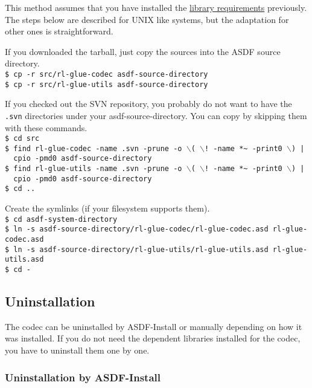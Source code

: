 \documentclass[11pt,a4paper,dvipdfm]{article}
\newcommand{\prompttext}[1]{\texttt{#1}}
\newcommand{\shprompt}[1]{\prompttext{\$ #1}}
\begin{document}
This method assumes that you have installed the
\hyperlink{softreqs}{library requirements} previously. The steps below are
described for UNIX like systems, but the adaptation for other ones is
straightforward.

If you downloaded the tarball, just copy the sources into the ASDF source
directory. \\
\shprompt{cp -r src/rl-glue-codec asdf-source-directory} \\
\shprompt{cp -r src/rl-glue-utils asdf-source-directory}

If you checked out the SVN repository, you probably do not want to have the
\prompttext{.svn} directories under your asdf-source-directory. You can
copy by skipping them with these commands. \\
\shprompt{cd src} \\
\shprompt{find rl-glue-codec -name .svn -prune
          -o $\backslash$( $\backslash$!~-name *\~{} -print0 $\backslash$) | \\
\mbox{~~}cpio -pmd0 asdf-source-directory} \\
\shprompt{find rl-glue-utils -name .svn -prune
          -o $\backslash$( $\backslash$!~-name *\~{} -print0 $\backslash$) | \\
\mbox{~~}cpio -pmd0 asdf-source-directory} \\
\shprompt{cd ..}

Create the symlinks (if your filesystem supports them). \\
\shprompt{cd asdf-system-directory} \\
\shprompt{ln -s asdf-source-directory/rl-glue-codec/rl-glue-codec.asd
          rl-glue-codec.asd} \\
\shprompt{ln -s asdf-source-directory/rl-glue-utils/rl-glue-utils.asd
          rl-glue-utils.asd} \\
\shprompt{cd -}

\subsection{Uninstallation}

The codec can be uninstalled by ASDF-Install or manually depending on how
it was installed.  If you do not need the dependent libraries installed for
the codec, you have to uninstall them one by one.

\subsubsection{Uninstallation by ASDF-Install}
\end{document}
